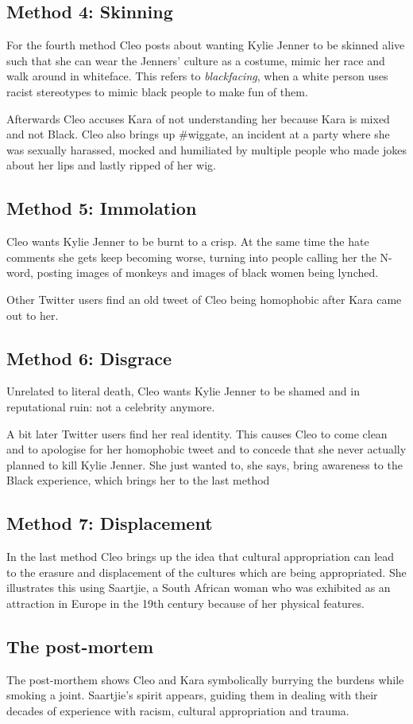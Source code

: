 \documentclass{article}
\begin{document}
\subsection{Method 4: Skinning} 
For the fourth method Cleo posts about wanting Kylie Jenner to be skinned alive such that she can wear the Jenners' culture as a costume, mimic her race and walk around in whiteface. This refers to \emph{blackfacing}, when a white person uses racist stereotypes to mimic black people to make fun of them.
 
Afterwards Cleo accuses Kara of not understanding her because Kara is mixed and not  Black. Cleo also brings up \#wiggate, an incident at a party where she was sexually harassed, mocked and humiliated by multiple people who made jokes about her lips and lastly ripped of her wig.
 
\subsection{Method 5: Immolation}
Cleo wants Kylie Jenner to be burnt to a crisp. At the same time the hate comments she gets keep becoming worse, turning into people calling her the N-word, posting images of monkeys and images of black women being lynched.
 
Other Twitter users find an old tweet of Cleo being homophobic after Kara came out to her. 
 
\subsection{Method 6: Disgrace}
Unrelated to literal death, Cleo wants Kylie Jenner to be shamed and in reputational ruin: not a celebrity anymore.
 
A bit later Twitter users find her real identity. This causes Cleo to come clean and to apologise for her homophobic tweet and to concede that she never actually planned to kill Kylie Jenner. She just wanted to, she says, bring awareness to the Black experience, which brings her to the last method
 
\subsection{Method 7: Displacement} 
In the last method Cleo brings up the idea that cultural appropriation can lead to the erasure and displacement of the cultures which are being appropriated. She illustrates this using Saartjie, a South African woman who was exhibited as an attraction in Europe in the 19th century because of her physical features.
 
\subsection{The post-mortem} 
The post-morthem shows Cleo and Kara symbolically burrying the burdens while smoking a joint. Saartjie's spirit appears, guiding them in dealing with their decades of experience with racism, cultural appropriation and trauma. 
 
\end{document}

